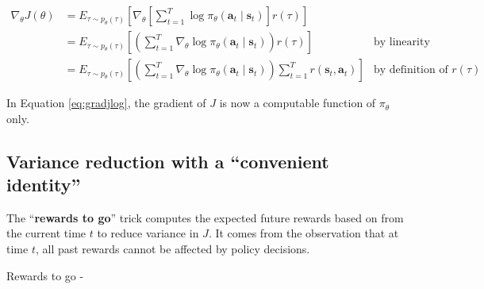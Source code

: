 \documentclass{article}
\begin{document}
\begin{subequations}
  \begin{align}
    \nabla_\theta J(\theta) 
      &= E_{\tau\sim p_\theta(\tau)}\left[\nabla_\theta \left[\sum_{t=1}^T\log\pi_\theta\left(\mathbf{a}_t\mid \mathbf{s}_t\right)\right] r(\tau)\right]\\
      &= E_{\tau\sim p_\theta(\tau)}\left[ \left(\sum_{t=1}^T\nabla_\theta\log\pi_\theta\left(\mathbf{a}_t\mid \mathbf{s}_t\right)\right) r(\tau)\right] &\text{by linearity}\\
      &= E_{\tau\sim p_\theta(\tau)}\left[ \left(\sum_{t=1}^T\nabla_\theta\log\pi_\theta\left(\mathbf{a}_t\mid \mathbf{s}_t\right)\right) \sum_{t=1}^T r\left(\mathbf{s}_t,\mathbf{a}_t\right)\right] &\text{by definition of }r(\tau) \label{eq:gradjlog}
  \end{align}
\end{subequations}

In Equation \eqref{eq:gradjlog}, the gradient of $J$ is now a computable function of $\pi_\theta$ only.

\subsection{Variance reduction with a ``convenient identity''}

The ``\textbf{rewards to go}'' trick computes the expected future rewards 
based on from the current time $t$ to reduce variance in $J$. It comes from the 
observation that at time $t$, all past rewards cannot be affected by policy decisions.

Rewards to go - 

\small


\end{document}
